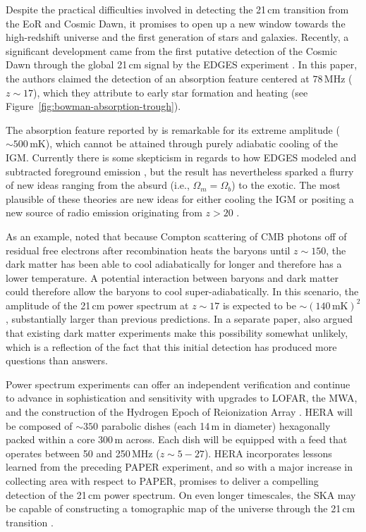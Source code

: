 \begin{bibunit}
Despite the practical difficulties involved in detecting the 21\,cm transition from the EoR and
Cosmic Dawn, it promises to open up a new window towards the high-redshift universe and the first
generation of stars and galaxies.  Recently, a significant development came from the first putative
detection of the Cosmic Dawn through the global 21\,cm signal by the EDGES experiment
\citep{2018Natur.555...67B}. In this paper, the authors claimed the detection of an absorption
feature centered at $78\,\text{MHz}$ ($z\sim17$), which they attribute to early star formation and
heating (see Figure~\ref{fig:bowman-absorption-trough}).

The absorption feature reported by \citet{2018Natur.555...67B} is remarkable for its extreme
amplitude ($\sim 500\,\text{mK}$), which cannot be attained through purely adiabatic cooling of the
IGM.  Currently there is some skepticism in regards to how EDGES modeled and subtracted foreground
emission \citep{2018arXiv180501421H}, but the result has nevertheless sparked a flurry of new ideas
ranging from the absurd (i.e., $\Omega_m = \Omega_b$) to the exotic.  The most plausible of these
theories are new ideas for either cooling the IGM \citep[e.g.,][]{2018Natur.555...71B} or positing a
new source of radio emission originating from $z > 20$ \citep[e.g.,][]{2018arXiv180301815E}.

As an example, \citet{2018Natur.555...71B} noted that because Compton scattering of CMB photons off
of residual free electrons after recombination heats the baryons until $z\sim 150$, the dark matter
has been able to cool adiabatically for longer and therefore has a lower temperature. A potential
interaction between baryons and dark matter could therefore allow the baryons to cool
super-adiabatically. In this scenario, the amplitude of the 21\,cm power spectrum at $z\sim 17$ is
expected to be $\sim (140\,\text{mK})^2$, substantially larger than previous predictions.  In a
separate paper, \citet{2018arXiv180303091B} also argued that existing dark matter experiments make
this possibility somewhat unlikely, which is a reflection of the fact that this initial detection
has produced more questions than answers.

Power spectrum experiments can offer an independent verification and continue to advance in
sophistication and sensitivity with upgrades to LOFAR, the MWA, and the construction of the Hydrogen
Epoch of Reionization Array \citep[HERA;][]{2017PASP..129d5001D}. HERA will be composed of $\sim350$
parabolic dishes (each 14\,m in diameter) hexagonally packed within a core 300\,m across.  Each dish
will be equipped with a feed that operates between 50 and 250\,MHz ($z\sim5-27$). HERA incorporates
lessons learned from the preceding PAPER experiment, and so with a major increase in collecting area
with respect to PAPER, promises to deliver a compelling detection of the 21\,cm power spectrum.
On even longer timescales, the SKA may be capable of constructing a tomographic map of the universe
through the 21\,cm transition \citep{2013ExA....36..235M}.


\end{bibunit}

